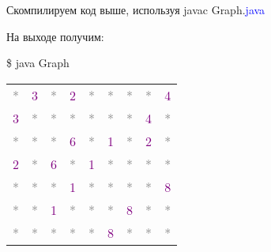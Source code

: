 Скомпилируем код выше, используя { javac Graph.\textcolor{Blue}{java}}

\vspace{\baselineskip}

На выходе получим:

\begin{tcolorbox}
    {
    \$ java Graph \\
    \begin{tabular}{*{9}{c}}
        \textcolor{Gray}{*} & \textcolor{Purple}{3} & \textcolor{Gray}{*} & \textcolor{Purple}{2} & \textcolor{Gray}{*} & \textcolor{Gray}{*} & \textcolor{Gray}{*} & \textcolor{Gray}{*} & \textcolor{Purple}{4} \\
        
        \textcolor{Purple}{3} & \textcolor{Gray}{*} & \textcolor{Gray}{*} & \textcolor{Gray}{*} & \textcolor{Gray}{*} & \textcolor{Gray}{*} & \textcolor{Gray}{*} & \textcolor{Purple}{4} & \textcolor{Gray}{*} \\
        
        \textcolor{Gray}{*} & \textcolor{Gray}{*} & \textcolor{Gray}{*} & \textcolor{Purple}{6} & \textcolor{Gray}{*} & \textcolor{Purple}{1} & \textcolor{Gray}{*} & \textcolor{Purple}{2} & \textcolor{Gray}{*} \\
        
        \textcolor{Purple}{2} & \textcolor{Gray}{*} & \textcolor{Purple}{6} & \textcolor{Gray}{*} & \textcolor{Purple}{1} & \textcolor{Gray}{*} & \textcolor{Gray}{*} & \textcolor{Gray}{*} & \textcolor{Gray}{*} \\
        
        \textcolor{Gray}{*} & \textcolor{Gray}{*} & \textcolor{Gray}{*} & \textcolor{Purple}{1} & \textcolor{Gray}{*} & \textcolor{Gray}{*} & \textcolor{Gray}{*} & \textcolor{Gray}{*} & \textcolor{Purple}{8} \\
        
        \textcolor{Gray}{*} & \textcolor{Gray}{*} & \textcolor{Purple}{1} & \textcolor{Gray}{*} & \textcolor{Gray}{*} & \textcolor{Gray}{*} & \textcolor{Purple}{8} & \textcolor{Gray}{*} & \textcolor{Gray}{*} \\
        
        \textcolor{Gray}{*} & \textcolor{Gray}{*} & \textcolor{Gray}{*} & \textcolor{Gray}{*} & \textcolor{Gray}{*} & \textcolor{Purple}{8} & \textcolor{Gray}{*} & \textcolor{Gray}{*} & \textcolor{Gray}{*} \\
        

\end{tabular}}
\end{tcolorbox}
